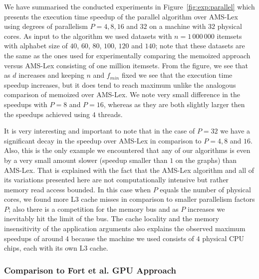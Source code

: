 \documentclass[13pt,a4paper]{article}
\begin{document}
We have summarised the conducted experiments in Figure~\ref{fig:exp:parallel} which presents the execution time speedup of the parallel algorithm over AMS-Lex using degrees of parallelism $P = 4, 8, 16$ and $32$ on a machine with $32$ physical cores. As input to the algorithm we used datasets with $n = 1\,000\,000$ itemsets with alphabet size of $40$, $60$, $80$, $100$, $120$ and $140$; note that these datasets are the same as the ones used for experimentally comparing the memoized approach versus AMS-Lex consisting of one million itemsets. From the figure, we see that as $d$ increases and keeping $n$ and $f_{min}$ fixed we see that the execution time speedup increases, but it does tend to reach maximum unlike the analogous comparison of memoized over AMS-Lex. We note very small difference in the speedups with $P = 8$ and $P = 16$, whereas as they are both slightly larger then the speedups achieved using $4$ threads.

It is very interesting and important to note that in the case of $P = 32$ we have a significant decay in the speedup over AMS-Lex in comparison to $P = 4, 8$ and $16$. Also, this is the only example we encountered that any of our algorithms is even by a very small amount slower (speedup smaller than $1$ on the graphs) than AMS-Lex. That is explained with the fact that the AMS-Lex algorithm and all of its variations presented here are not computationally intensive but rather memory read access bounded. In this case when $P$ equals the number of physical cores, we found more L3 cache misses in comparison to smaller parallelism factors $P$; also there is a competition for the memory bus and as $P$ increases we inevitably hit the limit of the bus. The cache locality and the memory insensitivity of the application arguments also explains the observed maximum speedups of around $4$ because the machine we used consists of $4$ physical CPU chips, each with its own L3 cache.


\subsubsection{Comparison to Fort et al. GPU Approach}
\end{document}

